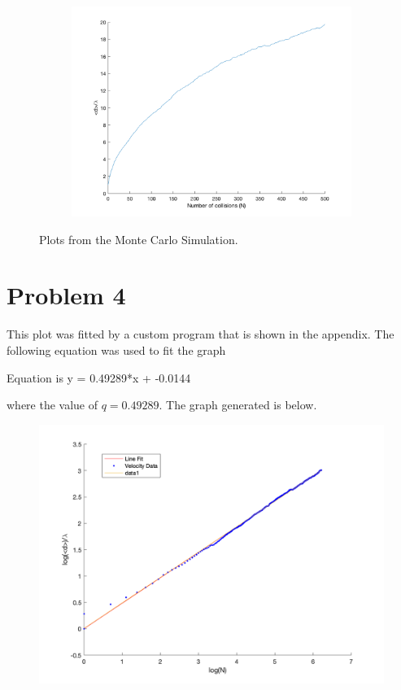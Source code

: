 \documentclass[12pt]{article}
\begin{document}
\begin{figure}[htp]
\begin{subfigure}{0.49\columnwidth}
\centering
\includegraphics[width=\textwidth]{500.png}
\caption{}
\label{fig:time3}
\end{subfigure}\hfill

\caption{Plots from the Monte Carlo Simulation.}
\label{fig:time}

\end{figure}

\newpage

\section*{Problem 4}

This plot was fitted by a custom program that is shown in the appendix. The following equation was used to fit the graph

\begin{center}
Equation is y = 0.49289*x + -0.0144
\end{center}

where the value of $q = 0.49289$. The graph generated is below. 

\begin{figure}[h!]
    \centering
    {{\includegraphics[width=15cm]{log_plot.png}}}%
    \qquad
    \caption{ }%
    \label{fig:example}%
\end{figure}
\end{document}
